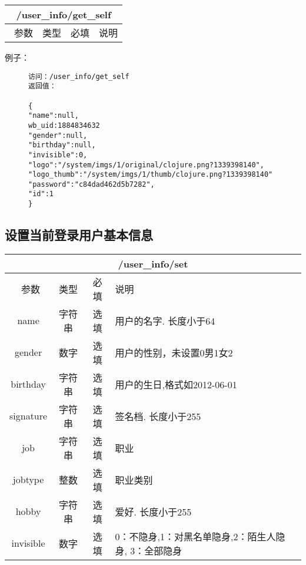 \documentclass[cs4size]{ctexartutf8}
\begin{document}
\begin{table}[H]
   \begin{center}
\begin{tabular}{|c|c|c|p{12cm}|}
\hline
\multicolumn{4}{|c|}{/user\_info/get\_self} \\
\hline\hline
 \  参数  & 类型 & 必填 &  说明  \\
\hline
\end{tabular}
   \end{center}
\end{table}

例子：

\begin{figure}[H]
\begin{verbatim}
访问：/user_info/get_self
返回值：

{
"name":null,
wb_uid:1884834632
"gender":null,
"birthday":null,
"invisible":0,
"logo":"/system/imgs/1/original/clojure.png?1339398140",
"logo_thumb":"/system/imgs/1/thumb/clojure.png?1339398140"
"password":"c84dad462d5b7282",
"id":1
}

\end{verbatim}
\end{figure}



\subsection{设置当前登录用户基本信息}

\begin{table}[H]
   \begin{center}
\begin{tabular}{|c|c|c|p{12cm}|}
\hline
\multicolumn{4}{|c|}{/user\_info/set} \\
\hline\hline
 \  参数  & 类型 & 必填 &  说明  \\
\hline
 name  & 字符串 & 选填 &  用户的名字. 长度小于64\\
\hline
 gender  & 数字 & 选填 &  用户的性别，未设置0男1女2\\
\hline
 birthday  & 字符串 & 选填 &  用户的生日,格式如2012-06-01\\
 \hline
 signature  & 字符串 & 选填 &  签名档. 长度小于255\\
 \hline
 job  & 字符串 & 选填 &  职业\\
 \hline
 jobtype  & 整数 & 选填 &  职业类别\\
 \hline
 hobby  & 字符串 & 选填 &  爱好. 长度小于255\\
 \hline
 invisible  & 数字 & 选填 &  0：不隐身,1：对黑名单隐身,2：陌生人隐身, 3：全部隐身\\
\hline
\end{tabular}
   \end{center}
\end{table}
\end{document}

